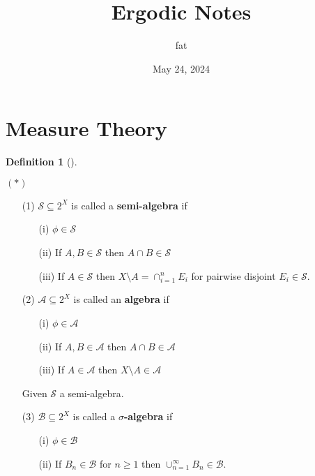 \documentclass{article}
\title{Ergodic Notes}
\author{fat}
\date{May 24, 2024}
\theoremstyle{definition}
\newtheorem{dfn}{Definition}
\newenvironment{dfns}[1][]{%
  \begin{dfn}[#1]$ $\par\nobreak\ignorespaces
}{%
  \end{dfn}
}
\begin{document}
\maketitle
\thispagestyle{fancy}
\renewcommand{\footrulewidth}{0.4pt}
\cfoot{\thepage}
\renewcommand{\headrulewidth}{0.4pt}

\section{Measure Theory}

\begin{dfns}
	$(*)$
	\begin{enumerate}
		\item[(1)] $\mathscr{S} \subseteq 2^X$ is called a \textbf{semi-algebra} if 
			\begin{enumerate}
				\item[(i)] $\phi \in \mathscr{S}$
					
				\item[(ii)] If $A, B \in \mathscr{S}$ then $A \cap B \in \mathscr{S}$

				\item[(iii)] If $A \in \mathscr{S}$ then $X \setminus A = \cap_{i = 1}^n E_i$ for pairwise disjoint $E_i \in \mathscr{S}$.
			\end{enumerate}

		\item[(2)] $\mathscr{A} \subseteq 2^X$ is called an \textbf{algebra} if 
			\begin{enumerate}
				\item[(i)] $\phi \in \mathscr{A}$
					
				\item[(ii)] If $A, B \in \mathscr{A}$ then $A \cap B \in \mathscr{A}$

				\item[(iii)] If $A \in \mathscr{A}$ then $X \setminus A \in \mathscr{A}$ 
			\end{enumerate}
			Given $\mathscr{S}$ a semi-algebra.

		\item[(3)] $\mathscr{B} \subseteq 2^X$ is called a \textbf{$\sigma$-algebra} if 
			\begin{enumerate}
				\item[(i)] $\phi \in \mathscr{B}$
					
				\item[(ii)] If $B_n \in \mathscr{B}$ for $n \geq 1$ then $\cup_{n = 1}^\infty B_n \in \mathscr{B}$.


\end{enumerate}
\end{enumerate}
\end{dfns}
\end{document}

